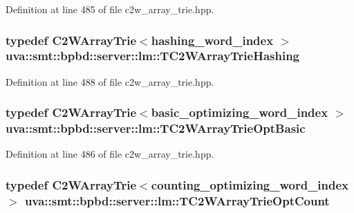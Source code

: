 Definition at line 485 of file c2w\+\_\+array\+\_\+trie.\+hpp.

\hypertarget{namespaceuva_1_1smt_1_1bpbd_1_1server_1_1lm_a1be2bc079ca976ffd330763977d42672}{}
\subsubsection[{T\+C2\+W\+Array\+Trie\+Hashing}]{\setlength{\rightskip}{0pt plus 5cm}typedef {\bf C2\+W\+Array\+Trie}$<${\bf hashing\+\_\+word\+\_\+index} $>$ {\bf uva\+::smt\+::bpbd\+::server\+::lm\+::\+T\+C2\+W\+Array\+Trie\+Hashing}}\label{namespaceuva_1_1smt_1_1bpbd_1_1server_1_1lm_a1be2bc079ca976ffd330763977d42672}


Definition at line 488 of file c2w\+\_\+array\+\_\+trie.\+hpp.

\hypertarget{namespaceuva_1_1smt_1_1bpbd_1_1server_1_1lm_a4e48b9bf4c470f14f3598b0cc8b85bed}{}
\subsubsection[{T\+C2\+W\+Array\+Trie\+Opt\+Basic}]{\setlength{\rightskip}{0pt plus 5cm}typedef {\bf C2\+W\+Array\+Trie}$<${\bf basic\+\_\+optimizing\+\_\+word\+\_\+index} $>$ {\bf uva\+::smt\+::bpbd\+::server\+::lm\+::\+T\+C2\+W\+Array\+Trie\+Opt\+Basic}}\label{namespaceuva_1_1smt_1_1bpbd_1_1server_1_1lm_a4e48b9bf4c470f14f3598b0cc8b85bed}


Definition at line 486 of file c2w\+\_\+array\+\_\+trie.\+hpp.

\hypertarget{namespaceuva_1_1smt_1_1bpbd_1_1server_1_1lm_ac63a349121a4e9b501809e94b6c9b1c4}{}
\subsubsection[{T\+C2\+W\+Array\+Trie\+Opt\+Count}]{\setlength{\rightskip}{0pt plus 5cm}typedef {\bf C2\+W\+Array\+Trie}$<${\bf counting\+\_\+optimizing\+\_\+word\+\_\+index} $>$ {\bf uva\+::smt\+::bpbd\+::server\+::lm\+::\+T\+C2\+W\+Array\+Trie\+Opt\+Count}}\label{namespaceuva_1_1smt_1_1bpbd_1_1server_1_1lm_ac63a349121a4e9b501809e94b6c9b1c4}


